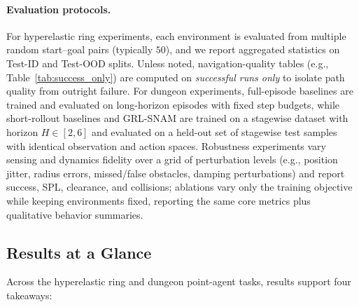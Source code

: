 \documentclass{article} %
\begin{document}
\paragraph{Evaluation protocols.}
For hyperelastic ring experiments, each environment is evaluated from multiple random start–goal pairs (typically $50$), and we report aggregated statistics on Test-ID and Test-OOD splits. Unless noted, navigation-quality tables (e.g., Table~\ref{tab:success_only}) are computed on \emph{successful runs only} to isolate path quality from outright failure. For dungeon experiments, full-episode baselines are trained and evaluated on long-horizon episodes with fixed step budgets, while short-rollout baselines and GRL-SNAM are trained on a stagewise dataset with horizon $H \in [2,6]$ and evaluated on a held-out set of stagewise test samples with identical observation and action spaces. Robustness experiments vary sensing and dynamics fidelity over a grid of perturbation levels (e.g., position jitter, radius errors, missed/false obstacles, damping perturbations) and report success, SPL, clearance, and collisions; ablations vary only the training objective while keeping environments fixed, reporting the same core metrics plus qualitative behavior summaries.


\subsection{Results at a Glance}
\label{subsec:results_overview}

Across the hyperelastic ring and dungeon point-agent tasks, results support four takeaways:
\end{document}
